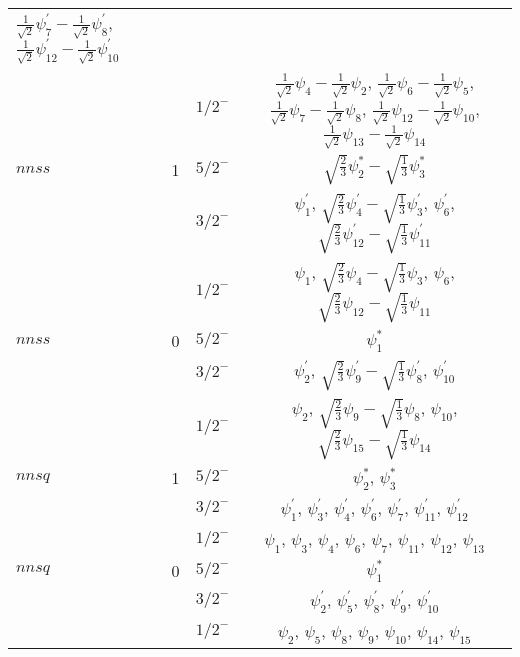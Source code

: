 \documentclass[prd,twocolumn,floatfix,nofootinbib]{revtex4}
\begin{document}
\begin{table*}[!htb]
\begin{tabular}{lccc}
                $\frac{1}{\sqrt{2}}\psi_{7}^{\prime}-\frac{1}{\sqrt{2}}\psi_{8}^{\prime}$,
                $\frac{1}{\sqrt{2}}\psi_{12}^{\prime}-\frac{1}{\sqrt{2}}\psi_{10}^{\prime}$ \\
        &   & ${1/2}^{-}$ & $\frac{1}{\sqrt{2}}\psi_{4}-\frac{1}{\sqrt{2}}\psi_{2}$,
                $\frac{1}{\sqrt{2}}\psi_{6}-\frac{1}{\sqrt{2}}\psi_{5}$,
                $\frac{1}{\sqrt{2}}\psi_{7}-\frac{1}{\sqrt{2}}\psi_{8}$,
                $\frac{1}{\sqrt{2}}\psi_{12}-\frac{1}{\sqrt{2}}\psi_{10}$,
                $\frac{1}{\sqrt{2}}\psi_{13}-\frac{1}{\sqrt{2}}\psi_{14}$ \\
        $nnss$ & 1
            & ${5/2}^{-}$ & $\sqrt{\frac{2}{3}}\psi_{2}^{\ast}-\sqrt{\frac{1}{3}}\psi_{3}^{\ast}$ \\
        &   & ${3/2}^{-}$ & $\psi_{1}^{\prime}$, $\sqrt{\frac{2}{3}}\psi_{4}^{\prime}-\sqrt{\frac{1}{3}}\psi_{3}^{\prime}$, 
                $\psi_{6}^{\prime}$, $\sqrt{\frac{2}{3}}\psi_{12}^{\prime}-\sqrt{\frac{1}{3}}\psi_{11}^{\prime}$ \\
        &   & ${1/2}^{-}$ & $\psi_{1}$, $\sqrt{\frac{2}{3}}\psi_{4}-\sqrt{\frac{1}{3}}\psi_{3}$, 
                $\psi_{6}$, $\sqrt{\frac{2}{3}}\psi_{12}-\sqrt{\frac{1}{3}}\psi_{11}$ \\
        $nnss$ & 0
            & ${5/2}^{-}$ & $\psi_{1}^{\ast}$ \\
        &   & ${3/2}^{-}$ & $\psi_{2}^{\prime}$, $\sqrt{\frac{2}{3}}\psi_{9}^{\prime}-\sqrt{\frac{1}{3}}\psi_{8}^{\prime}$, 
                $\psi_{10}^{\prime}$ \\
        &   & ${1/2}^{-}$ & $\psi_{2}$, $\sqrt{\frac{2}{3}}\psi_{9}-\sqrt{\frac{1}{3}}\psi_{8}$, 
                $\psi_{10}$, $\sqrt{\frac{2}{3}}\psi_{15}-\sqrt{\frac{1}{3}}\psi_{14}$ \\
        $nnsq$ & 1
            & ${5/2}^{-}$ & $\psi_{2}^{\ast}$, $\psi_{3}^{\ast}$ \\
        &   & ${3/2}^{-}$ & $\psi_{1}^{\prime}$, $\psi_{3}^{\prime}$, $\psi_{4}^{\prime}$, $\psi_{6}^{\prime}$,
                $\psi_{7}^{\prime}$, $\psi_{11}^{\prime}$, $\psi_{12}^{\prime}$ \\
        &   & ${1/2}^{-}$ & $\psi_{1}$, $\psi_{3}$, $\psi_{4}$, $\psi_{6}$, $\psi_{7}$, $\psi_{11}$, $\psi_{12}$, $\psi_{13}$ \\
        $nnsq$ & 0
            & ${5/2}^{-}$ & $\psi_{1}^{\ast}$ \\
        &   & ${3/2}^{-}$ & $\psi_{2}^{\prime}$, $\psi_{5}^{\prime}$, $\psi_{8}^{\prime}$, $\psi_{9}^{\prime}$, $\psi_{10}^{\prime}$ \\
        &   & ${1/2}^{-}$ & $\psi_{2}$, $\psi_{5}$, $\psi_{8}$, $\psi_{9}$, $\psi_{10}$, $\psi_{14}$, $\psi_{15}$ \\
    \bottomrule[0.5pt]\bottomrule[1.5pt]
    \end{tabular}%
\end{table*}
\end{document}
